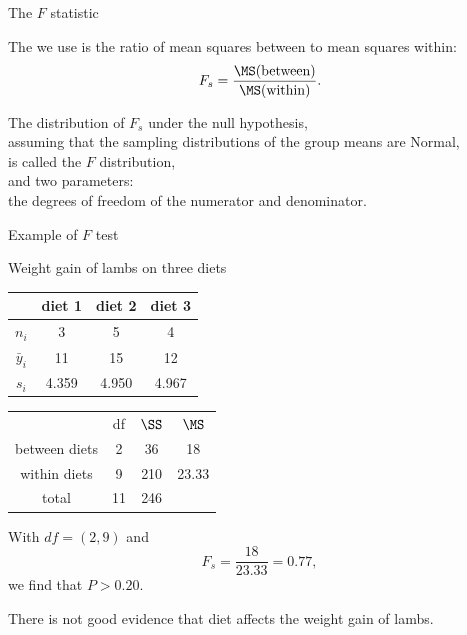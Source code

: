 \begin{frame}{The $F$ statistic}

    The  we use is the ratio of mean squares between to mean squares within:
    \[
        F_s = \frac{ \MS(\text{between}) }{ \MS(\text{within}) } .
    \]


    \vspace{2em}

    The distribution of $F_s$ under the null hypothesis,  \\
    assuming that the sampling distributions of the group means are Normal, \\
    is called the \alert{$F$ distribution}, \\
    and  two parameters: \\
    the degrees of freedom of the numerator and denominator.


\end{frame}


\begin{frame}{Example of $F$ test}

    Weight gain of lambs on three diets
    \begin{center}
        \begin{tabular}{cccc}
            & diet 1 & diet 2 & diet 3 \\
            \hline
            $n_i$ & 3 & 5 & 4 \\
            $\bar y_i$ & 11 & 15 & 12 \\
            $s_i$ & 4.359 & 4.950 & 4.967 \\
        \end{tabular}
    \end{center}

    \pause

    \begin{center}
        \begin{tabular}{cccc}
            & df & $\SS$ & $\MS$ \\
            between diets & 2 & 36 & 18 \\
            within diets & 9 & 210 & 23.33 \\
            \hline
            total & 11 & 246 & \\
        \end{tabular}
    \end{center}


    \vspace{2em}

    With $df = (2,9)$ and
    \[ F_s = \frac{ 18 }{ 23.33 } = 0.77 , \]
    we find that $P > 0.20$.


    \vspace{2em}

    \pause
    There is not good evidence that diet affects the weight gain of lambs.


\end{frame}




